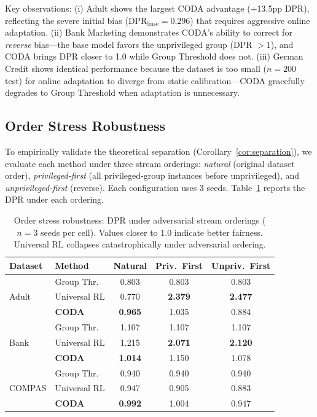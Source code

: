 \documentclass[10pt,twocolumn]{article}
\theoremstyle{definition}
\begin{document}
Key observations: (i) Adult shows the largest CODA advantage (+13.5pp DPR), reflecting the severe initial bias ($\text{DPR}_{\text{base}} = 0.296$) that requires aggressive online adaptation. (ii) Bank Marketing demonstrates CODA's ability to correct for \emph{reverse} bias---the base model favors the unprivileged group (DPR $> 1$), and CODA brings DPR closer to 1.0 while Group Threshold does not. (iii) German Credit shows identical performance because the dataset is too small ($n=200$ test) for online adaptation to diverge from static calibration---CODA gracefully degrades to Group Threshold when adaptation is unnecessary.

\subsection{Order Stress Robustness}
\label{sec:orderstress}

To empirically validate the theoretical separation (Corollary~\ref{cor:separation}), we evaluate each method under three stream orderings: \emph{natural} (original dataset order), \emph{privileged-first} (all privileged-group instances before unprivileged), and \emph{unprivileged-first} (reverse). Each configuration uses 3 seeds. Table~\ref{tab:orderstress} reports the DPR under each ordering.

\begin{table}[t]
\centering
\caption{Order stress robustness: DPR under adversarial stream orderings ($n=3$ seeds per cell). Values closer to 1.0 indicate better fairness. Universal RL collapses catastrophically under adversarial ordering.}
\label{tab:orderstress}
\small
\begin{tabular}{@{}llccc@{}}
\toprule
Dataset & Method & Natural & Priv.\ First & Unpriv.\ First \\
\midrule
\multirow{3}{*}{Adult}
 & Group Thr. & 0.803 & 0.803 & 0.803 \\
 & Universal RL & 0.770 & \textbf{2.379} & \textbf{2.477} \\
 & \textbf{CODA} & \textbf{0.965} & 1.035 & 0.884 \\
\midrule
\multirow{3}{*}{Bank}
 & Group Thr. & 1.107 & 1.107 & 1.107 \\
 & Universal RL & 1.215 & \textbf{2.071} & \textbf{2.120} \\
 & \textbf{CODA} & \textbf{1.014} & 1.150 & 1.078 \\
\midrule
\multirow{3}{*}{COMPAS}
 & Group Thr. & 0.940 & 0.940 & 0.940 \\
 & Universal RL & 0.947 & 0.905 & 0.883 \\
 & \textbf{CODA} & \textbf{0.992} & 1.004 & 0.947 \\
\bottomrule
\end{tabular}
\end{table}
\end{document}
